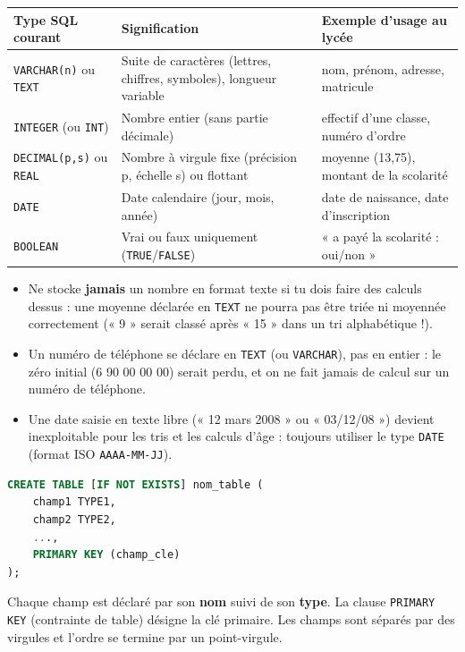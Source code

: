 \documentclass[11pt]{article}
\begin{document}
\begin{center}
\begin{tabularx}{\linewidth}{|l|X|X|}
\hline
\rowcolor{popblueL} \textbf{Type SQL courant} & \textbf{Signification} & \textbf{Exemple d'usage au lycée} \\
\hline
\texttt{VARCHAR(n)} ou \texttt{TEXT} & Suite de caractères (lettres, chiffres, symboles), longueur variable & nom, prénom, adresse, matricule \\
\hline
\texttt{INTEGER} (ou \texttt{INT}) & Nombre entier (sans partie décimale) & effectif d'une classe, numéro d'ordre \\
\hline
\texttt{DECIMAL(p,s)} ou \texttt{REAL} & Nombre à virgule fixe (précision p, échelle s) ou flottant & moyenne (13,75), montant de la scolarité \\
\hline
\texttt{DATE} & Date calendaire (jour, mois, année) & date de naissance, date d'inscription \\
\hline
\texttt{BOOLEAN} & Vrai ou faux uniquement (\texttt{TRUE}/\texttt{FALSE}) & « a payé la scolarité : oui/non » \\
\hline
\end{tabularx}
\end{center}

\begin{attention}
\begin{itemize}
\item Ne stocke \textbf{jamais} un nombre en format texte si tu dois faire des calculs dessus : une moyenne déclarée en \texttt{TEXT} ne pourra pas être triée ni moyennée correctement (« 9 » serait classé après « 15 » dans un tri alphabétique !).
\item Un numéro de téléphone se déclare en \texttt{TEXT} (ou \texttt{VARCHAR}), pas en entier : le zéro initial (6 90 00 00 00) serait perdu, et on ne fait jamais de calcul sur un numéro de téléphone.
\item Une date saisie en texte libre (« 12 mars 2008 » ou « 03/12/08 ») devient inexploitable pour les tris et les calculs d'âge : toujours utiliser le type \texttt{DATE} (format ISO \texttt{AAAA-MM-JJ}).
\end{itemize}
\end{attention}

\begin{propriete}
\begin{lstlisting}[language=SQL]
CREATE TABLE [IF NOT EXISTS] nom_table (
    champ1 TYPE1,
    champ2 TYPE2,
    ...,
    PRIMARY KEY (champ_cle)
);
\end{lstlisting}
Chaque champ est déclaré par son \textbf{nom} suivi de son \textbf{type}. La clause \texttt{PRIMARY KEY} (contrainte de table) désigne la clé primaire. Les champs sont séparés par des virgules et l'ordre se termine par un point-virgule.
\end{propriete}
\end{document}
